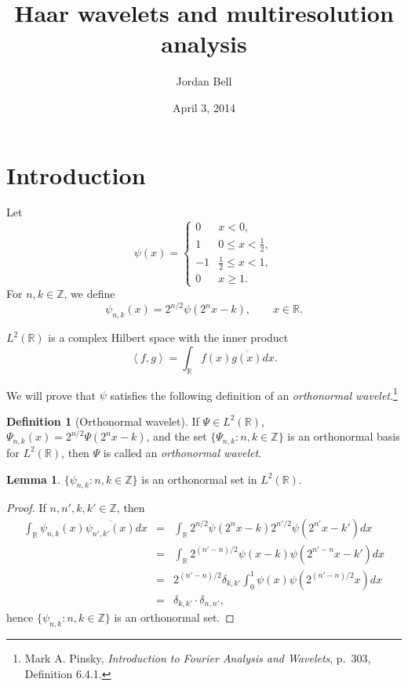 \documentclass{article}
\newcommand{\inner}[2]{\left\langle #1, #2 \right\rangle}
\theoremstyle{definition}
\newtheorem{lemma}[theorem]{Lemma}
\theoremstyle{definition}
\newtheorem{definition}[theorem]{Definition}
\begin{document}
\title{Haar wavelets and multiresolution analysis}
\author{Jordan Bell}
\date{April 3, 2014}

\maketitle

\section{Introduction}
Let
\[
\psi(x)=\begin{cases}
0&x<0,\\
1&0 \leq x < \frac{1}{2},\\
-1&\frac{1}{2} \leq x < 1,\\
0&x \geq 1.
\end{cases}
\]
For $n,k \in \mathbb{Z}$, we define
\[
\psi_{n,k}(x)=2^{n/2} \psi(2^n x-k), \qquad x \in \mathbb{R}.
\]



$L^2(\mathbb{R})$  is a complex Hilbert space with the inner product
\[
\inner{f}{g} = \int_{\mathbb{R}} f(x) \overline{g(x)} dx.
\]

We will prove that $\psi$ satisfies   the following definition of an {\em orthonormal wavelet}.\footnote{Mark A. Pinsky, {\em Introduction to
Fourier Analysis and Wavelets}, p.~303, Definition 6.4.1.}

\begin{definition}[Orthonormal wavelet]
If $\Psi \in L^2(\mathbb{R})$, $\Psi_{n,k}(x)=2^{n/2}\Psi(2^nx-k)$, and the set $\{\Psi_{n,k}: n,k \in \mathbb{Z}\}$ is an orthonormal basis for $L^2(\mathbb{R})$,
then $\Psi$ is called an {\em orthonormal wavelet}.
\end{definition}

\begin{lemma}
$\{\psi_{n,k}: n,k \in \mathbb{Z}\}$ is an  orthonormal set in $L^2(\mathbb{R})$.
\label{orthonormal}
\end{lemma}
\begin{proof}
If $n,n',k,k' \in \mathbb{Z}$, then
\begin{eqnarray*}
\int_{\mathbb{R}} \psi_{n,k}(x) \overline{\psi_{n',k'}(x)} dx&=&\int_{\mathbb{R}} 2^{n/2} \psi(2^nx-k)2^{n'/2} \psi(2^{n'}x-k') dx\\
&=&\int_{\mathbb{R}} 2^{(n'-n)/2} \psi(x-k) \psi(2^{n'-n}x-k') dx\\
&=& 2^{(n'-n)/2} \delta_{k,k'}  \int_0^1 \psi(x) \psi(2^{(n'-n)/2}x) dx\\
&=&\delta_{k,k'} \cdot \delta_{n,n'},
\end{eqnarray*}
hence  $\{\psi_{n,k}: n,k \in \mathbb{Z}\}$ is an orthonormal set.
\end{proof}
\end{document}
